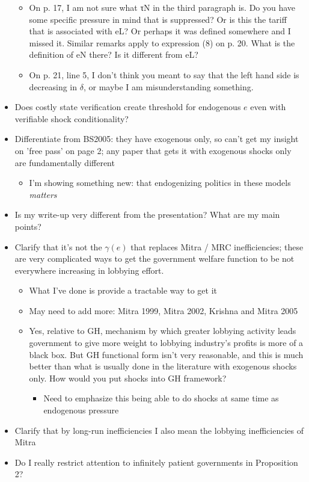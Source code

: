 \documentclass[12pt]{article}
\begin{document}
\begin{itemize}
\begin{itemize}
			\item On p. 17, I am not sure what τN in the third paragraph is. Do you have some specific pressure in mind that is suppressed? Or is this the tariff that is associated with eL? Or perhaps it was defined somewhere and I missed it. Similar remarks apply to expression (8) on p. 20. What is the definition of eN there? Is it different from eL?
			\item On p. 21, line 5, I don’t think you meant to say that the left hand side is decreasing in $\delta$, or maybe I am misunderstanding something.
		\end{itemize}
	\item Does costly state verification create threshold for endogenous $e$ even with verifiable shock conditionality?
	\item Differentiate from BS2005: they have exogenous only, so can't get my insight on 'free pass' on page 2; any paper that gets it with exogenous shocks only are fundamentally different
		\begin{itemize}
			\item I'm showing something new: that endogenizing politics in these models \textit{matters}
		\end{itemize}
	\item Is my write-up very different from the presentation? What are my main points?
	\item Clarify that it's not the $\gamma(e)$ that replaces Mitra / MRC inefficiencies; these are very complicated ways to get the government welfare function to be not everywhere increasing in lobbying effort.
		\begin{itemize}
			\item What I've done is provide a tractable way to get it
			\item May need to add more: Mitra 1999, Mitra 2002, Krishna and Mitra 2005
			\item Yes, relative to GH, mechanism by which greater lobbying activity leads government to give more weight to lobbying industry's profits is more of a black box. But GH functional form isn't very reasonable, and this is much better than what is usually done in the literature with exogenous shocks only. How would you put shocks into GH framework?
				\begin{itemize}
					\item Need to emphasize this being able to do shocks at same time as endogenous pressure
				\end{itemize}
		\end{itemize}
	\item Clarify that by long-run inefficiencies I also mean the lobbying inefficiencies of Mitra
	\item Do I really restrict attention to infinitely patient governments in Proposition 2?
\end{itemize}
\end{document}
